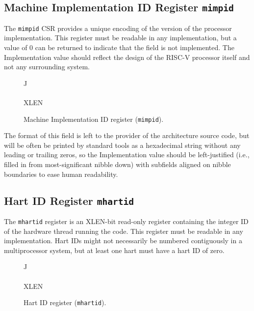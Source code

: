 \subsection{Machine Implementation ID Register {\tt mimpid}}

The {\tt mimpid} CSR provides a unique encoding of the version of the
processor implementation.  This register must be readable in any
implementation, but a value of 0 can be returned to indicate that the
field is not implemented.  The Implementation value should reflect the
design of the RISC-V processor itself and not any surrounding system.

\begin{figure*}[h!]
{\footnotesize
\begin{center}
\begin{tabular}{J}
 \\
\hline
{}  \\
\hline
XLEN \\
\end{tabular}
\end{center}
}
\vspace{-0.1in}
\caption{Machine Implementation ID register ({\tt mimpid}).}
\label{mimpidreg}
\end{figure*}

\begin{commentary}
The format of this field is left to the provider of the architecture
source code, but will be often be printed by standard tools as a
hexadecimal string without any leading or trailing zeros, so the
Implementation value should be left-justified (i.e., filled in from
most-significant nibble down) with subfields aligned on nibble
boundaries to ease human readability.
\end{commentary}

\subsection{Hart ID Register {\tt mhartid}}

The {\tt mhartid} register is an XLEN-bit read-only register
containing the integer ID of the hardware thread running the code.
This register must be readable in any implementation.  Hart IDs might
not necessarily be numbered contiguously in a multiprocessor system,
but at least one hart must have a hart ID of zero.

\begin{figure*}[h!]
{\footnotesize
\begin{center}
\begin{tabular}{J}
 \\
\hline
{}\\
\hline
XLEN \\
\end{tabular}
\end{center}
}
\vspace{-0.1in}
\caption{Hart ID register ({\tt mhartid}).}
\label{mhartidreg}
\end{figure*}


